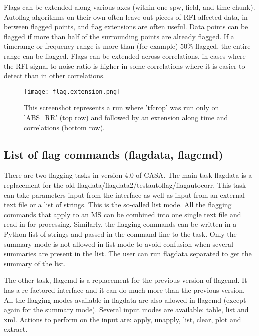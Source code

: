 Flags can be extended along various axes (within one spw, field, and time-chunk). 
Autoflag algorithms on their own often leave out pieces of RFI-affected data, in-between flagged
points, and flag extensions are often useful.  Data points can be flagged if more than half of 
the surrounding points are already flagged.  If a timerange or frequency-range is more than 
(for example) 50\% flagged, the entire range can be flagged.  Flags can be extended across
correlations, in cases where the RFI-signal-to-noise ratio is higher in some correlations where
it is easier to detect than in other correlations. 

\begin{figure}
\texttt{[image: flag.extension.png]}
\caption{This screenshot represents a run where 'tfcrop' was run only on
'ABS\_RR' (top row) and followed by an extension along time and correlations
(bottom row). }
\end{figure}




\subsection{List of flag commands (flagdata, flagcmd)}
\label{Sec:FlagCmdLists}
There are two flagging tasks in version 4.0 of CASA. The main task flagdata is
a replacement for the old flagdata/flagdata2/testautoflag/flagautocorr. This
task can take parameters input from the interface as well as input from an
external text file or a list of strings. This is the so-called list mode. All the flagging commands
that apply to an MS can be combined into one single text file and read in for
processing. Similarly, the flagging commands can be written in a Python list of strings
and passed in the command line to the task. Only the summary mode is not allowed in list mode to avoid
confusion when several summaries are present in the list. The user can run
flagdata separated to get the summary of the list. 

The other task, flagcmd is a replacement for the previous version of flagcmd. It
has a re-factored interface and it can do much more than the previous version.
All the flagging modes available in flagdata are also allowed in flagcmd
(except again for the summary mode). Several input modes are available: table,
list and xml. Actions to perform on the input are: apply, unapply, list,
clear, plot and extract.

